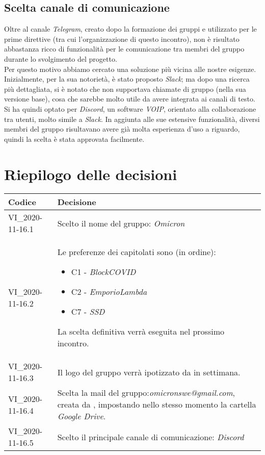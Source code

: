 \documentclass[12pt]{article}
\begin{document}
	\subsection{Scelta canale di comunicazione}
	Oltre al canale \textit{Telegram}, creato dopo la formazione dei gruppi e utilizzato per le prime direttive (tra cui l'organizzazione di questo incontro), non è risultato abbastanza ricco di funzionalità per le comunicazione tra membri del gruppo durante lo svolgimento del progetto.\\
	Per questo motivo abbiamo cercato una soluzione più vicina alle nostre esigenze.\\
	Inizialmente, per la sua notorietà, è stato proposto \textit{Slack}; ma dopo una ricerca più dettagliata, si è notato che non supportava chiamate di gruppo (nella sua versione base), cosa che sarebbe molto utile da avere integrata ai canali di testo.\\
	Si ha quindi optato per \textit{Discord}, un software \textit{VOIP}, orientato alla collaborazione tra utenti, molto simile a \textit{Slack}. In aggiunta alle sue estensive funzionalità, diversi membri del gruppo risultavano avere già molta esperienza d'uso a riguardo, quindi la scelta è stata approvata facilmente.

\section*{Riepilogo delle decisioni}
\setcounter{table}{-1}
{

\centering
\renewcommand{\arraystretch}{1.5}
\begin{longtable}{>{\centering}p{} >{}p{}}
\rowcolor{azzurro1}
\textbf{Codice} &
\centerline{\textbf{Decisione}}\\
\endhead

VI\_2020-11-16.1 & Scelto il nome del gruppo: \textit{Omicron}\\
VI\_2020-11-16.2 & Le preferenze dei capitolati sono (in ordine):
\begin{itemize}
\item C1 - \textit{BlockCOVID}
\item C2 - \textit{EmporioLambda}
\item C7 - \textit{SSD}
\end{itemize}
La scelta definitiva verrà eseguita nel prossimo incontro.\\
VI\_2020-11-16.3 & Il logo del gruppo verrà ipotizzato da \NM{} in settimana. \\
VI\_2020-11-16.4 & Scelta la mail del gruppo:\textit{omicronswe@gmail.com}, creata da \MDI{}, impostando nello stesso momento la cartella \textit{Google Drive}.\\
VI\_2020-11-16.5 & Scelto il principale canale di comunicazione: \textit{Discord}\\

\end{longtable}
}
\end{document}
